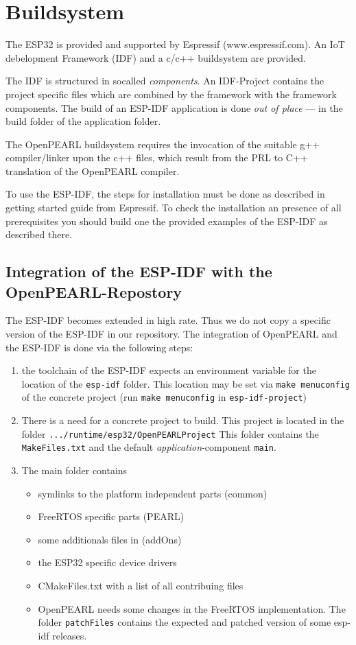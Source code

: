 \section{Buildsystem}

The ESP32 is provided and supported by Espressif (www.espressif.com).
An IoT debelopment Framework (IDF) and a c/c++ buildsystem are provided. 

The IDF is structured in socalled {\em components}. An IDF-Project contains
the project specific files which are combined by the framework with the 
framework components. The build of an ESP-IDF application is done 
{\em out of place} --- in the build folder of the application folder.

The OpenPEARL buildsystem requires the invocation of the suitable 
g++ compiler/linker upon the c++ files, which result from the PRL to C++ 
translation of the OpenPEARL compiler.

To use the ESP-IDF, the steps for installation must be done as described in 
getting started guide from Espressif.
To check the installation an presence of all prerequisites you should build
 one the provided examples of the ESP-IDF as described there.

\subsection{Integration of the ESP-IDF with the OpenPEARL-Repostory}
The ESP-IDF becomes extended in high rate. Thus we do not copy a specific
version of the ESP-IDF in our repository.
The integration of OpenPEARL and the ESP-IDF is done via the following steps:
\begin{enumerate}
\item the toolchain of the ESP-IDF expects an environment variable
   for the location of the \texttt{esp-idf} folder.
   This location may be set via \texttt{make menuconfig}
   of the concrete project 
   (run \texttt{make menuconfig} in \texttt{esp-idf-project}) 
\item There is a need for a concrete project to build.
   This project is located in the folder \texttt{.../runtime/esp32/OpenPEARLProject}
   This folder contains the \texttt{MakeFiles.txt} and the default \textit{application}-component \texttt{main}.
\item The main folder contains 
  \begin{itemize}
  \item symlinks to the platform independent parts (common)
  \item FreeRTOS specific parts (PEARL)
  \item  some additionals files in (addOns)
  \item the ESP32 specific device drivers
  \item CMakeFiles.txt with a list of all contribuing files
  \item OpenPEARL needs some changes in the FreeRTOS implementation.
    The folder \texttt{patchFiles} contains the expected and patched 
    version of some esp-idf releases.
  \end{itemize}
\end{enumerate}

